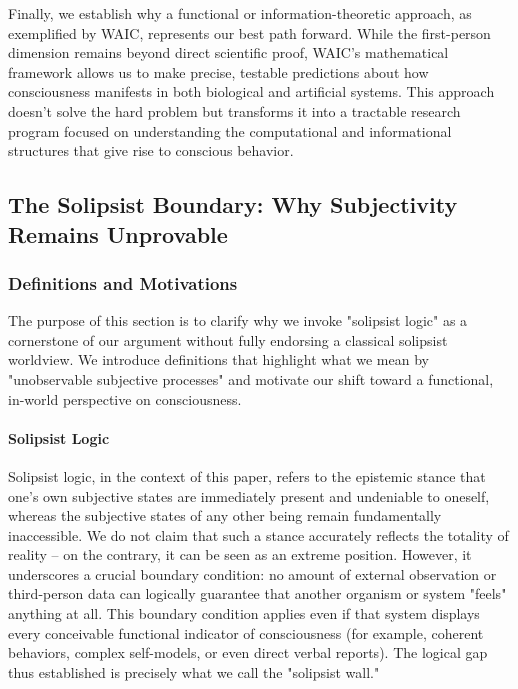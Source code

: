 \documentclass[12pt,letterpaper]{article}
\begin{document}
Finally, we establish why a functional or information-theoretic approach, as exemplified by WAIC, represents our best path forward. While the first-person dimension remains beyond direct scientific proof, WAIC's mathematical framework allows us to make precise, testable predictions about how consciousness manifests in both biological and artificial systems. This approach doesn't solve the hard problem but transforms it into a tractable research program focused on understanding the computational and informational structures that give rise to conscious behavior.

\subsection{The Solipsist Boundary: Why Subjectivity Remains Unprovable}

\subsubsection{Definitions and Motivations}

The purpose of this section is to clarify why we invoke "solipsist logic" as a cornerstone of our argument without fully endorsing a classical solipsist worldview. We introduce definitions that highlight what we mean by "unobservable subjective processes" and motivate our shift toward a functional, in-world perspective on consciousness.

\paragraph{Solipsist Logic}

Solipsist logic, in the context of this paper, refers to the epistemic stance that one's own subjective states are immediately present and undeniable to oneself, whereas the subjective states of any other being remain fundamentally inaccessible. We do not claim that such a stance accurately reflects the totality of reality -- on the contrary, it can be seen as an extreme position. However, it underscores a crucial boundary condition: no amount of external observation or third-person data can logically guarantee that another organism or system "feels" anything at all. This boundary condition applies even if that system displays every conceivable functional indicator of consciousness (for example, coherent behaviors, complex self-models, or even direct verbal reports). The logical gap thus established is precisely what we call the "solipsist wall."
\end{document}
